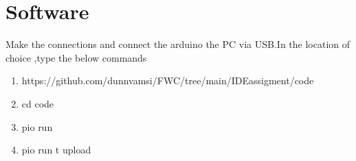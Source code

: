 \documentclass[journal,10pt]{article}
\begin{document}
\section*{\large Software}
Make the connections and connect the arduino the PC via USB.In the location of choice ,type the below commands
\begin{enumerate}
\item https://github.com/dunnvamsi/FWC/tree/main/IDEassigment/code
\item cd code
\item pio run
\item pio run \-t upload
\end{enumerate}
\end{document}
